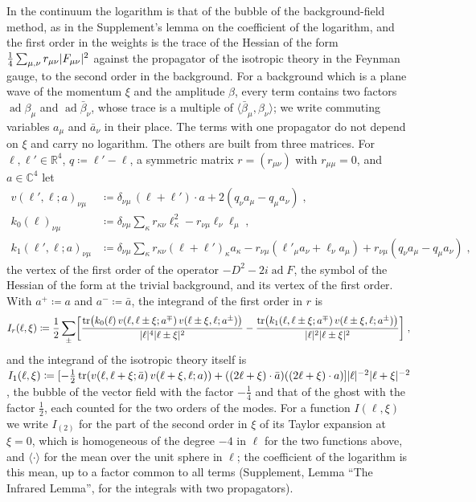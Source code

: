 \documentclass[11pt]{preprint}
\newcommand{\tr}{\operatorname{tr}}
\DeclarePairedDelimiter{\abs}{\lvert}{\rvert}
\numberwithin{equation}{section}
\theoremstyle{definition}
\theoremstyle{remark}
\theoremstyle{plain}
\begin{document}
In the continuum the logarithm is that of the bubble of the background-field method, as in the Supplement's lemma on the coefficient of the logarithm, and the first order in the weights is the trace of the Hessian of the form $\frac14\sum_{\mu,\nu}r_{\mu\nu}\abs{F_{\mu\nu}}^2$ against the propagator of the isotropic theory in the Feynman gauge, to the second order in the background. For a background which is a plane wave of the momentum $\xi$ and the amplitude $\beta$, every term contains two factors $\operatorname{ad}\beta_\mu$ and $\operatorname{ad}\bar\beta_\nu$, whose trace is a multiple of $\langle\bar\beta_\mu, \beta_\nu\rangle$; we write commuting variables $a_\mu$ and $\bar a_\nu$ in their place. The terms with one propagator do not depend on $\xi$ and carry no logarithm. The others are built from three matrices. For $\ell, \ell' \in \mathbb R^4$, $q \coloneqq \ell' - \ell$, a symmetric matrix $r = (r_{\mu\nu})$ with $r_{\mu\mu} = 0$, and $a \in \mathbb C^4$ let
\begin{equation}\label{eq:weight-vertices}
\begin{aligned}
    v(\ell', \ell; a)_{\nu\mu} &\coloneqq \delta_{\nu\mu}\,(\ell + \ell') \cdot a + 2(q_\nu a_\mu - q_\mu a_\nu)\;,\\
    k_0(\ell)_{\nu\mu} &\coloneqq \delta_{\nu\mu}\sum_\kappa r_{\kappa\nu}\ell_\kappa^2 - r_{\nu\mu}\ell_\nu\ell_\mu\;,\\
    k_1(\ell', \ell; a)_{\nu\mu} &\coloneqq \delta_{\nu\mu}\sum_\kappa r_{\kappa\nu}(\ell + \ell')_\kappa a_\kappa - r_{\nu\mu}(\ell'_\mu a_\nu + \ell_\nu a_\mu) + r_{\nu\mu}(q_\nu a_\mu - q_\mu a_\nu)\;,
\end{aligned}
\end{equation}
the vertex of the first order of the operator $-D^2 - 2i\operatorname{ad}F$, the symbol of the Hessian of the form at the trivial background, and its vertex of the first order. With $a^+ \coloneqq a$ and $a^- \coloneqq \bar a$, the integrand of the first order in $r$ is
\begin{equation}\label{eq:weight-integrand}
    I_r(\ell, \xi) \coloneqq \frac12\sum_\pm\biggl[\frac{\tr\bigl(k_0(\ell)\,v(\ell, \ell \pm \xi; a^\mp)\,v(\ell \pm \xi, \ell; a^\pm)\bigr)}{\abs\ell^4\abs{\ell \pm \xi}^2} - \frac{\tr\bigl(k_1(\ell, \ell \pm \xi; a^\mp)\,v(\ell \pm \xi, \ell; a^\pm)\bigr)}{\abs\ell^2\abs{\ell \pm \xi}^2}\biggr]\;,
\end{equation}
and the integrand of the isotropic theory itself is $I_1(\ell, \xi) \coloneqq [-\frac12\tr(v(\ell, \ell + \xi; \bar a)\,v(\ell + \xi, \ell; a)) + ((2\ell + \xi) \cdot \bar a)((2\ell + \xi) \cdot a)]\abs\ell^{-2}\abs{\ell + \xi}^{-2}$, the bubble of the vector field with the factor $-\frac14$ and that of the ghost with the factor $\frac12$, each counted for the two orders of the modes. For a function $I(\ell, \xi)$ we write $I_{(2)}$ for the part of the second order in $\xi$ of its Taylor expansion at $\xi = 0$, which is homogeneous of the degree $-4$ in $\ell$ for the two functions above, and $\langle\cdot\rangle$ for the mean over the unit sphere in $\ell$; the coefficient of the logarithm is this mean, up to a factor common to all terms (Supplement, Lemma ``The Infrared Lemma'', for the integrals with two propagators).
\end{document}
